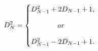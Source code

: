 \documentclass[14pt,preview]{standalone}
\begin{document}
\begin{preview}
\begin{equation}
    \label{Eq:I:6:7}
    D_N^2=
    \begin{cases}
    D_{N-1}^2+2D_{N-1}+1,\\[2ex]
    \kern 3.7em \textit{or}\\[2ex]
    D_{N-1}^2-2D_{N-1}+1.
    \end{cases}
\end{equation}
\end{preview}
\end{document}
